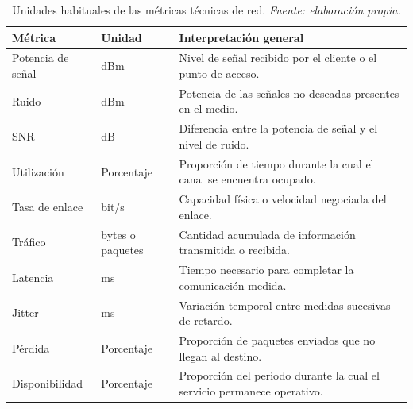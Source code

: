 \begin{table}[H]
    \centering
    \small
    \renewcommand{\arraystretch}{1.35}

    \caption[Unidades habituales de las métricas técnicas.]
    {Unidades habituales de las métricas técnicas de red.
    \textit{Fuente: elaboración propia.}}

    \label{tab:unidades-metricas-tecnicas}

    \begin{tabular}{
        p{}
        p{}
        p{}
    }
        \hline

        \textbf{Métrica}
        &
        \textbf{Unidad}
        &
        \textbf{Interpretación general}
        \\

        \hline

        Potencia de señal
        &
        dBm
        &
        Nivel de señal recibido por el cliente o el punto de acceso.
        \\

        Ruido
        &
        dBm
        &
        Potencia de las señales no deseadas presentes en el medio.
        \\

        SNR
        &
        dB
        &
        Diferencia entre la potencia de señal y el nivel de ruido.
        \\

        Utilización
        &
        Porcentaje
        &
        Proporción de tiempo durante la cual el canal se encuentra
        ocupado.
        \\

        Tasa de enlace
        &
        bit/s
        &
        Capacidad física o velocidad negociada del enlace.
        \\

        Tráfico
        &
        bytes o paquetes
        &
        Cantidad acumulada de información transmitida o recibida.
        \\

        Latencia
        &
        ms
        &
        Tiempo necesario para completar la comunicación medida.
        \\

        Jitter
        &
        ms
        &
        Variación temporal entre medidas sucesivas de retardo.
        \\

        Pérdida
        &
        Porcentaje
        &
        Proporción de paquetes enviados que no llegan al destino.
        \\

        Disponibilidad
        &
        Porcentaje
        &
        Proporción del periodo durante la cual el servicio permanece
        operativo.
        \\

        \hline
    \end{tabular}
\end{table}


